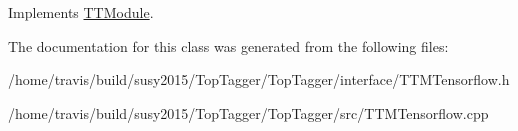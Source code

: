 Implements \hyperlink{classTTModule_a14e7c03fbf4ee1a5008c9344adc7c896}{T\-T\-Module}.



The documentation for this class was generated from the following files\-:\begin{DoxyCompactItemize}
\item 
/home/travis/build/susy2015/\-Top\-Tagger/\-Top\-Tagger/interface/T\-T\-M\-Tensorflow.\-h\item 
/home/travis/build/susy2015/\-Top\-Tagger/\-Top\-Tagger/src/T\-T\-M\-Tensorflow.\-cpp\end{DoxyCompactItemize}
